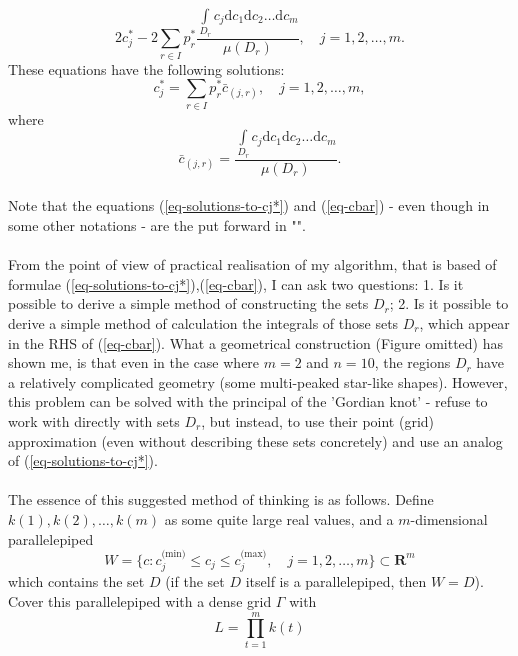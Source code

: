 \begin{equation}
2 c_{j}^{*} - 2 \sum\limits_{r \in I} p_{r}^{*}\frac{\int\limits_{D_{r}} c_{j}\mathrm{d}c_{1}\mathrm{d}c_{2}\dots\mathrm{d}c_{m}}{\mu(D_{r})} , \quad j = 1,2,\dots,m.
\end{equation}
These equations have the following solutions:
\begin{equation}
c_{j}^{*} = \sum\limits_{r \in I} p_{r}^{*} \bar{c}_{(j,r)}, \quad j = 1,2,\dots,m, \label{eq-solutions-to-cj*}
\end{equation}
where
\begin{equation}
\bar{c}_{(j,r)} = \frac{\int\limits_{D_{r}} c_{j}\mathrm{d}c_{1}\mathrm{d}c_{2}\dots\mathrm{d}c_{m}}{\mu(D_{r})}. \label{eq-cbar}
\end{equation}
\\
Note that the equations (\ref{eq-solutions-to-cj*}) and (\ref{eq-cbar}) - even though in some other notations - are the put forward in "\cite{balk_2010}".\\
\\
From the point of view of practical realisation of my algorithm, that is based of formulae (\ref{eq-solutions-to-cj*}),(\ref{eq-cbar}), I can ask two questions: 1. Is it possible to derive a simple method of constructing the sets $D_{r}$; 2. Is it possible to derive a simple method of calculation the integrals of those sets $D_{r}$, which appear in the RHS of (\ref{eq-cbar}). What a geometrical construction (Figure omitted) has shown me, is that even in the case where $m=2$ and $n=10$, the regions $D_{r}$ have a relatively complicated geometry (some multi-peaked star-like shapes). However, this problem can be solved with the principal of the 'Gordian knot' - refuse to work with directly with sets $D_{r}$, but instead, to use their point (grid) approximation (even without describing these sets concretely) and use an analog of (\ref{eq-solutions-to-cj*}).\\
\\
The essence of this suggested method of thinking is as follows. Define $k(1),k(2),\dots,k(m)$ as some quite large real values, and a $m$-dimensional parallelepiped
\begin{equation}
W=\{ c:c_{j}^{(\text{min)}} \leq c_{j} \leq c_{j}^{(\text{max)}}, \quad j=1,2,\dots,m \}\subset \boldsymbol{R}^{m}
\end{equation}
which contains the set $D$ (if the set $D$ itself is a parallelepiped, then $W=D$). Cover this parallelepiped with a dense grid $\Gamma$ with
\begin{equation}
L = \prod\limits_{t=1}^{m}k(t)
\end{equation}
